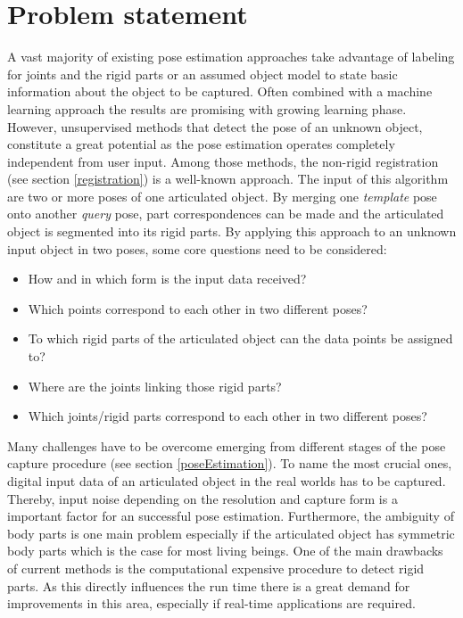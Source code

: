 \section{Problem statement}
A vast majority of existing pose estimation approaches take advantage of labeling for joints and the rigid parts or an assumed object model to state basic information about the object to be captured. Often combined with a machine learning approach the results are promising with growing learning phase. However, unsupervised methods that detect the pose of an unknown object, constitute a great potential as the pose estimation operates completely independent from user input. Among those methods, the non-rigid registration (see section \ref{registration}) is a well-known approach. The input of this algorithm are two or more poses of one articulated object. By merging one \textit{template} pose onto another \textit{query} pose, part correspondences can be made and the articulated object is segmented into its rigid parts. 
By applying this approach to an unknown input object in two poses, some core questions need to be considered:
\\\begin{itemize}
	\item How and in which form is the input data received?
	\item Which points correspond to each other in two different poses?
	\item To which rigid parts of the articulated object can the data points be assigned to?
	\item Where are the joints linking those rigid parts?
	\item Which joints/rigid parts correspond to each other in two different poses?
\end{itemize}
Many challenges have to be overcome emerging from different stages of the pose capture procedure (see section \ref{poseEstimation}). To name the most crucial ones, digital input data of an articulated object in the real worlds has to be captured. Thereby, input noise depending on the resolution and capture form is a important factor for an successful pose estimation. Furthermore, the ambiguity of body parts is one main problem especially if the articulated object has symmetric body parts which is the case for most living beings. One of the main drawbacks of current methods is the computational expensive procedure to detect rigid parts. As this directly influences the run time there is a great demand for improvements in this area, especially if real-time applications are required.

